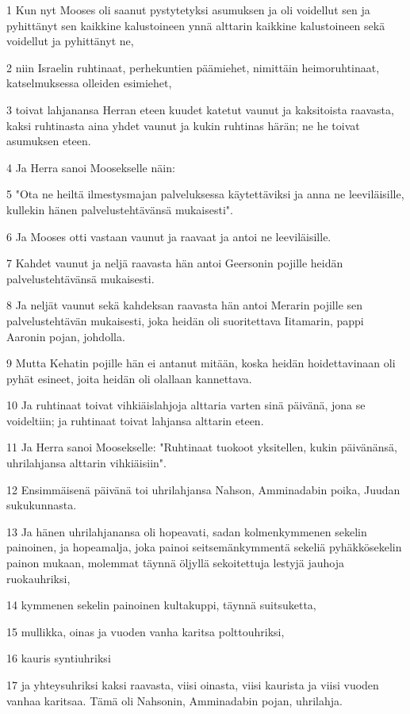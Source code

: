\par 1 Kun nyt Mooses oli saanut pystytetyksi asumuksen ja oli voidellut sen ja pyhittänyt sen kaikkine kalustoineen ynnä alttarin kaikkine kalustoineen sekä voidellut ja pyhittänyt ne,
\par 2 niin Israelin ruhtinaat, perhekuntien päämiehet, nimittäin heimoruhtinaat, katselmuksessa olleiden esimiehet,
\par 3 toivat lahjanansa Herran eteen kuudet katetut vaunut ja kaksitoista raavasta, kaksi ruhtinasta aina yhdet vaunut ja kukin ruhtinas härän; ne he toivat asumuksen eteen.
\par 4 Ja Herra sanoi Moosekselle näin:
\par 5 "Ota ne heiltä ilmestysmajan palveluksessa käytettäviksi ja anna ne leeviläisille, kullekin hänen palvelustehtävänsä mukaisesti".
\par 6 Ja Mooses otti vastaan vaunut ja raavaat ja antoi ne leeviläisille.
\par 7 Kahdet vaunut ja neljä raavasta hän antoi Geersonin pojille heidän palvelustehtävänsä mukaisesti.
\par 8 Ja neljät vaunut sekä kahdeksan raavasta hän antoi Merarin pojille sen palvelustehtävän mukaisesti, joka heidän oli suoritettava Iitamarin, pappi Aaronin pojan, johdolla.
\par 9 Mutta Kehatin pojille hän ei antanut mitään, koska heidän hoidettavinaan oli pyhät esineet, joita heidän oli olallaan kannettava.
\par 10 Ja ruhtinaat toivat vihkiäislahjoja alttaria varten sinä päivänä, jona se voideltiin; ja ruhtinaat toivat lahjansa alttarin eteen.
\par 11 Ja Herra sanoi Moosekselle: "Ruhtinaat tuokoot yksitellen, kukin päivänänsä, uhrilahjansa alttarin vihkiäisiin".
\par 12 Ensimmäisenä päivänä toi uhrilahjansa Nahson, Amminadabin poika, Juudan sukukunnasta.
\par 13 Ja hänen uhrilahjanansa oli hopeavati, sadan kolmenkymmenen sekelin painoinen, ja hopeamalja, joka painoi seitsemänkymmentä sekeliä pyhäkkösekelin painon mukaan, molemmat täynnä öljyllä sekoitettuja lestyjä jauhoja ruokauhriksi,
\par 14 kymmenen sekelin painoinen kultakuppi, täynnä suitsuketta,
\par 15 mullikka, oinas ja vuoden vanha karitsa polttouhriksi,
\par 16 kauris syntiuhriksi
\par 17 ja yhteysuhriksi kaksi raavasta, viisi oinasta, viisi kaurista ja viisi vuoden vanhaa karitsaa. Tämä oli Nahsonin, Amminadabin pojan, uhrilahja.
